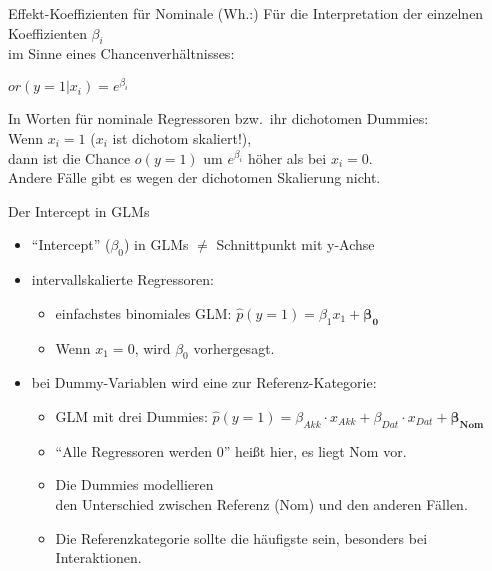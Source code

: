 \begin{frame}
  {Effekt-Koeffizienten für Nominale}
  (Wh.:) Für die Interpretation der einzelnen Koeffizienten $\beta_i$\\
  im Sinne eines Chancenverhältnisses:
  \begin{center}
    \alert{$or(y=1|x_i)=e^{\beta_i}$}
  \end{center}
  \pause
  In Worten \alert{für nominale Regressoren} bzw.\ ihr \alert{dichotomen Dummies}:\\
  \vspace{0.5cm}
  \pause
  Wenn $x_i=1$ ($x_i$ ist dichotom skaliert!),\\
  dann ist die Chance $o(y=1)$ um $e^{\beta_i}$ höher als bei $x_i=0$.\\
  \pause
  Andere Fälle gibt es wegen der dichotomen Skalierung nicht.
\end{frame}

\begin{frame}
  {Der Intercept in GLMs}
  \begin{itemize}[<+->]
    \item "`Intercept"' ($\beta_0$) in GLMs $\neq$ Schnittpunkt mit y-Achse
      \vspace{0.5cm}
    \item \alert{intervallskalierte Regressoren}:
      \begin{itemize}
	\item einfachstes binomiales GLM: \alert{$\hat{p}(y=1)=\beta_1x_1+\mathbf{\beta_0}$}
	\item Wenn $x_1=0$, wird $\beta_0$ vorhergesagt.
      \end{itemize}
      \vspace{0.5cm}
    \item bei \alert{Dummy-Variablen} wird eine zur Referenz-Kategorie:
      \begin{itemize}
	\item GLM mit drei Dummies: \alert{$\hat{p}(y=1)=\beta_{Akk}\cdot x_{Akk}+\beta_{Dat}\cdot x_{Dat}+\mathbf{\beta_{Nom}}$}
	\item "`Alle Regressoren werden 0"' heißt hier, es liegt Nom vor.
	\item Die Dummies modellieren\\
	  den \alert{Unterschied zwischen Referenz (Nom) und den anderen Fällen}.
	\item Die Referenzkategorie sollte die häufigste sein, besonders bei Interaktionen.
      \end{itemize}
  \end{itemize}
\end{frame}

